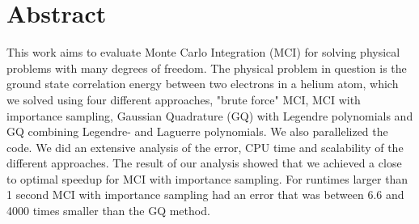 \section*{Abstract}
This work aims to evaluate Monte Carlo Integration (MCI) for solving physical
problems with many degrees of freedom. The physical problem in question is
the ground state correlation energy between two electrons in a helium atom,
which we solved using four different approaches, "brute force" MCI, MCI with
importance sampling, Gaussian Quadrature (GQ) with Legendre polynomials and GQ
combining Legendre- and Laguerre polynomials. We also parallelized the code.
We did an extensive analysis of the error,
CPU time and scalability of the different approaches. The result of our
analysis showed that we achieved a close to optimal speedup for MCI with
importance sampling. For runtimes larger than 1 second MCI with importance
sampling had an error that was between 6.6 and 4000 times smaller than the
GQ method.
